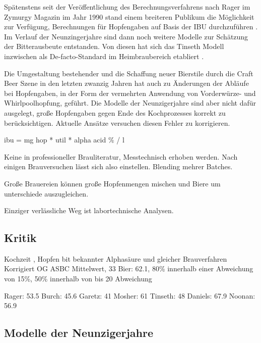 \documentclass[a4paper,parskip=half]{scrartcl}
\begin{document}
Spätenstens seit der Veröffentlichung des Berechnungsverfahrens nach
Rager im Zymurgy Magazin im Jahr 1990 stand einem breiteren
Publikum die Möglichkeit zur Verfügung, Berechnungen für Hopfengaben auf
Basis der IBU
durchzuführen \parencite[59]{Hall1997}. Im Verlauf der Neunzingerjahre
sind dann noch weitere Modelle zur Schätzung der Bitterausbeute entstanden.
Von diesen hat sich das Tinseth Modell inzwischen als De-facto-Standard im
Heimbraubereich etabliert \parencite[185]{Hieronymus2012}.

Die Umgestaltung bestehender und die Schaffung neuer Bierstile
durch die Craft Beer Szene in den letzten zwanzig Jahren hat auch zu Änderungen
der Abläufe bei Hopfengaben, in der Form der vermehrten Anwendung von Vorderwürze-
und Whirlpoolhopfung, geführt. Die Modelle der Neunzigerjahre sind aber
nicht dafür ausgelegt, große Hopfengaben gegen Ende des Kochprozesses korrekt
zu berücksichtigen. Aktuelle Ansätze versuchen diesen Fehler zu korrigieren.
\parencite[39]{Novotny2018}


\parencite[51]{Holle2010}
ibu = mg hop * util * alpha acid \% / l

\parencite[127]{Garetz1994} 
Keine in professioneller Brauliteratur, Messtechnisch erhoben
werden. Nach einigen Brauversuchen lässt sich also einstellen.
Blending mehrer Batches.

\parencite[76]{Daniels1996}
Große Brauereien können große Hopfenmengen mischen und
Biere um unterschiede auszugleichen.

\parencite[51]{Holle2010}
Einziger verlässliche Weg ist labortechnische Analysen.



\subsection*{Kritik}






\parencite{Bonham2001}
Kochzeit , Hopfen bit bekannter Alphasäure und gleicher Brauverfahren
Korrigiert OG
ASBC Mittelwert, 33 Bier: 62.1, 80\% innerhalb einer Abweichung von 15\%, 50\% innerhalb
von  bis 20 Abweichung

Rager: 53.5
Burch: 45.6
Garetz: 41
Mosher: 61
Tinseth: 48
Daniels: 67.9
Noonan: 56.9


\subsection*{Modelle der Neunzigerjahre}
\end{document}
